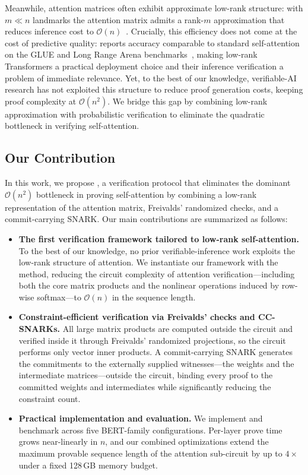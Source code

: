 \documentclass[runningheads]{llncs}
\begin{document}
Meanwhile, attention matrices often exhibit approximate low-rank structure: with $m \ll n$ landmarks the attention matrix admits a rank-$m$ approximation that reduces inference cost to $\mathcal{O}(n)$~\cite{Linformer,Nystromformer}. Crucially, this efficiency does not come at the cost of predictive quality: \nystromformer reports accuracy comparable to standard self-attention on the GLUE and Long Range Arena benchmarks~\cite{Nystromformer}, making low-rank Transformers a practical deployment choice and their inference verification a problem of immediate relevance. Yet, to the best of our knowledge, verifiable-AI research has not exploited this structure to reduce proof generation costs, keeping proof complexity at $\mathcal{O}(n^2)$. We bridge this gap by combining low-rank approximation with probabilistic verification to eliminate the quadratic bottleneck in verifying self-attention.

\subsection{Our Contribution}
In this work, we propose \name, a verification protocol that eliminates the dominant $\mathcal{O}(n^2)$ bottleneck in proving self-attention by combining a low-rank representation of the attention matrix, Freivalds' randomized checks, and a commit-carrying SNARK. Our main contributions are summarized as follows:
\begin{itemize}
    \item \textbf{The first verification framework tailored to low-rank self-attention.} To the best of our knowledge, no prior verifiable-inference work exploits the low-rank structure of attention. We instantiate our framework with the \nystrom method, reducing the circuit complexity of attention verification---including both the core matrix products and the nonlinear operations induced by row-wise softmax---to $\mathcal{O}(n)$ in the sequence length.
    \item \textbf{Constraint-efficient verification via Freivalds' checks and CC-SNARKs.} All large matrix products are computed outside the circuit and verified inside it through Freivalds' randomized projections, so the circuit performs only vector inner products. A commit-carrying SNARK generates the commitments to the externally supplied witnesses---the weights and the intermediate matrices---outside the circuit, binding every proof to the committed weights and intermediates while significantly reducing the constraint count.
    \item \textbf{Practical implementation and evaluation.} We implement and benchmark \name across five BERT-family configurations. Per-layer prove time grows near-linearly in $n$, and our combined optimizations extend the maximum provable sequence length of the attention sub-circuit by up to $4{\times}$ under a fixed 128\,GB memory budget.
\end{itemize}
\end{document}
